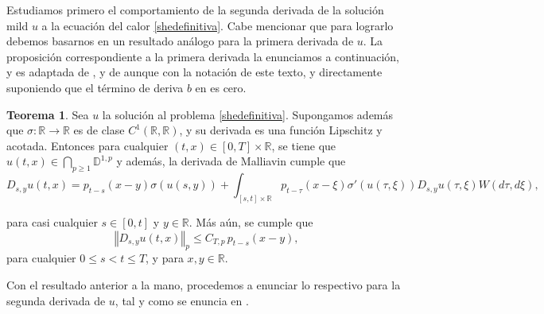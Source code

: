 \documentclass[letterpaper,twoside,12pt]{book}
\newcommand{\R}{\mathbb{R}}
\newcommand{\D}{\mathbb{D}}
\newcommand{\1}{\mathds{1}}
\renewcommand{\to}{\rightarrow}
\newcommand{\norm}[1]{\left\Vert #1 \right\Vert}
\theoremstyle{definition}
\theoremstyle{definition}
\newtheorem{teo}{Teorema}
\theoremstyle{remark}
\theoremstyle{definition}
\theoremstyle{definition}
\theoremstyle{definition}
\theoremstyle{definition}
\theoremstyle{definition}
\begin{document}
Estudiamos primero el comportamiento de la segunda derivada de la solución mild $u$ a la ecuación del calor \eqref{shedefinitiva}. Cabe mencionar que para lograrlo debemos basarnos en un resultado análogo para la primera derivada de $u$. La proposición correspondiente a la primera derivada la enunciamos a continuación, y es adaptada de \cite[proposición 5.1]{Nualart2007}, y de \cite[sección 4.1]{KUZGUN202268} aunque con la notación de este texto, y directamente suponiendo que el término de deriva $b$ en \cite{Nualart2007} es cero.

\begin{teo}\label{teocota1eraderivada}
   Sea $u$ la solución al problema \eqref{shedefinitiva}. Supongamos además que $\sigma:\R\to\R$ es de clase $C^1(\R,\R)$, y su derivada es una función Lipschitz y acotada. Entonces para cualquier $(t,x)\in [0,T]\times\R$, se tiene que $u(t,x)\in\bigcap_{p\geq1}\D^{1,p}$ y además, la derivada de Malliavin cumple que 
   \begin{equation}\label{formula1eraderivada}
      D_{s,y}u(t,x)=p_{t-s}(x-y)\sigma(u(s,y))+ \int_{[s,t]\times\R} p_{t-\tau}(x-\xi)\sigma'(u(\tau,\xi))D_{s,y}u(\tau,\xi)W(d\tau,d\xi),
   \end{equation}
   
   para casi cualquier $s\in [0,t]$ y $y\in \R$. Más aún, se cumple que 
   \begin{equation}\label{cota1eraderivada} 
      \norm{D_{s,y}u(t,x)}_{p}\leq C_{T,p \ }p_{t-s}(x-y),
   \end{equation}
   para cualquier $0\leq s<t\leq T$, y para $x,y\in \R$.
 \end{teo}
Con el resultado anterior a la mano, procedemos a enunciar lo respectivo para la segunda derivada de $u$, tal y como se enuncia en \cite{KUZGUN202268}.
\end{document}

